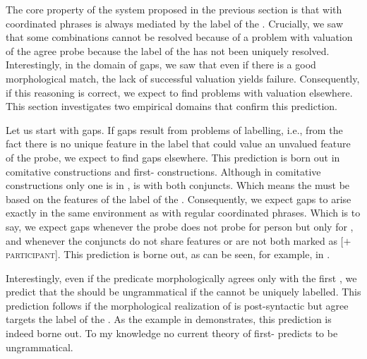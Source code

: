 \documentclass[output=paper,modfontsnewtxmath,hidelinks]{langscibook}
\begin{document}
The core property of the system proposed in the previous section is that  with coordinated  phrases is always mediated by the label of the . Crucially, we saw that some  combinations cannot be resolved because of a problem with valuation of the agree probe because the label of the  has not been uniquely resolved. Interestingly, in the domain of  gaps, we saw that even if there is a good morphological match, the lack of successful valuation yields  failure. Consequently, if this reasoning is correct, we expect to find problems with valuation elsewhere. This section investigates two empirical domains that confirm this prediction.

Let us start with  gaps. If  gaps result from problems of labelling, i.e., from the fact there is no unique feature in the label that could value an unvalued feature of the probe, we expect to find  gaps elsewhere. This prediction is born out in comitative constructions and first-  constructions. Although in comitative constructions only one  is in ,  is with both conjuncts. Which means the  must be based on the features of the label of the . Consequently, we expect  gaps to arise exactly in the same environment as with regular coordinated phrases. Which is to say, we expect  gaps whenever the probe does not probe for person but only for , and whenever the conjuncts do not share  features or are not both marked as [$+$\textsc{participant}]. This prediction is borne out, as can be seen, for example, in .

\z

\noindent Interestingly, even if the predicate morphologically agrees only with the first , we predict that the   should be ungrammatical if the  cannot be uniquely labelled. This prediction follows if the morphological realization of  is post-syntactic but agree targets the label of the . As the example in  demonstrates, this prediction is indeed borne out. To my knowledge no current theory of first-  predicts  to be ungrammatical.
\end{document}
